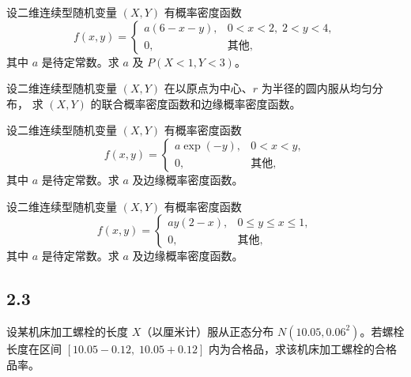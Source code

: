 \begin{homework}[27]
设二维连续型随机变量 $(X,Y)$ 有概率密度函数
\[
f(x,y) =
\begin{cases}
a(6 - x - y), & 0 < x < 2,\; 2 < y < 4, \\[6pt]
0, & \text{其他},
\end{cases}
\]
其中 $a$ 是待定常数。求 $a$ 及 $P(X < 1, Y < 3)$。
\end{homework}

\begin{homework}[28]
设二维连续型随机变量 $(X,Y)$ 在以原点为中心、$r$ 为半径的圆内服从均匀分布，
求 $(X,Y)$ 的联合概率密度函数和边缘概率密度函数。
\end{homework}

\begin{homework}[29]
设二维连续型随机变量 $(X,Y)$ 有概率密度函数
\[
f(x,y) =
\begin{cases}
a \exp(-y), & 0 < x < y, \\[6pt]
0, & \text{其他},
\end{cases}
\]
其中 $a$ 是待定常数。求 $a$ 及边缘概率密度函数。
\end{homework}

\begin{homework}[30]
设二维连续型随机变量 $(X,Y)$ 有概率密度函数
\[
f(x,y) =
\begin{cases}
a y (2 - x), & 0 \le y \le x \le 1, \\[6pt]
0, & \text{其他},
\end{cases}
\]
其中 $a$ 是待定常数。求 $a$ 及边缘概率密度函数。
\end{homework}
\subsection{2.3}
\begin{homework}[2.31]
设某机床加工螺栓的长度 $X$（以厘米计）服从正态分布 $N(10.05, 0.06^2)$。若螺栓长度在区间 $[10.05-0.12,\; 10.05+0.12]$ 内为合格品，求该机床加工螺栓的合格品率。
\end{homework}

